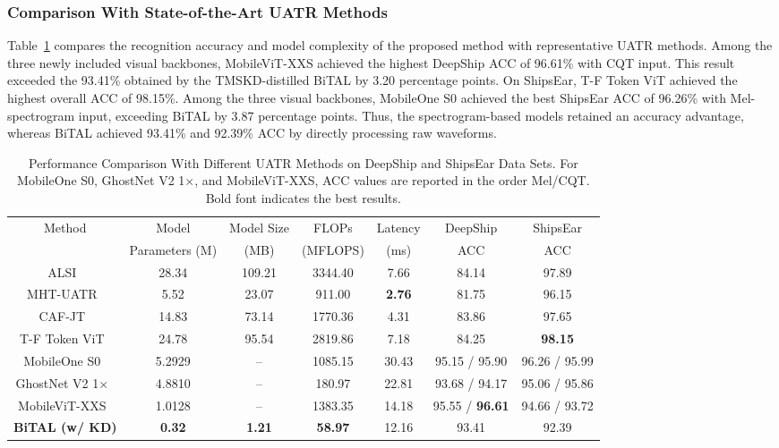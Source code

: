 ﻿\documentclass[lettersize,journal]{IEEEtran}
\begin{document}
\subsubsection{Comparison With State-of-the-Art UATR Methods}
Table~\ref{tab:comparison with Different UATR Methods} compares the recognition accuracy and model complexity of the proposed method with representative UATR methods. Among the three newly included visual backbones, MobileViT-XXS achieved the highest DeepShip ACC of 96.61\% with CQT input. This result exceeded the 93.41\% obtained by the TMSKD-distilled BiTAL by 3.20 percentage points. On ShipsEar, T-F Token ViT achieved the highest overall ACC of 98.15\%. Among the three visual backbones, MobileOne S0 achieved the best ShipsEar ACC of 96.26\% with Mel-spectrogram input, exceeding BiTAL by 3.87 percentage points. Thus, the spectrogram-based models retained an accuracy advantage, whereas BiTAL achieved 93.41\% and 92.39\% ACC by directly processing raw waveforms.

\begin{table}[!htbp]
\centering
\caption{Performance Comparison With Different UATR Methods on DeepShip and ShipsEar Data Sets. For MobileOne S0, GhostNet V2 1$\times$, and MobileViT-XXS, ACC values are reported in the order Mel/CQT. Bold font indicates the best results.}
\label{tab:comparison with Different UATR Methods}
\small
\setlength{\tabcolsep}{4pt}
\begin{tabular}{c|c|c|c|c|c|c}
\toprule
\multirow{2}{*}{Method} &
\multicolumn{1}{c|}{Model} &
\multicolumn{1}{c|}{Model Size} &
\multicolumn{1}{c|}{FLOPs} &
\multicolumn{1}{c|}{Latency} &
\multicolumn{1}{c|}{DeepShip} &
\multicolumn{1}{c}{ShipsEar} \\
 & Parameters (M) & (MB) & (MFLOPS) & (ms) & ACC & ACC \\
\midrule
ALSI~\cite{ALSIUATR} & 28.34 & 109.21 & 3344.40 & 7.66 & 84.14 & 97.89  \\
MHT-UATR~\cite{MHTUATR} & 5.52 & 23.07 & 911.00 & \textbf{2.76} & 81.75 & 96.15 \\
CAF-JT~\cite{CAFJTUATR} & 14.83 & 73.14 & 1770.36 & 4.31 & 83.86 & 97.65 \\
T-F Token ViT~\cite{TFTokenViT} & 24.78 & 95.54 & 2819.86 & 7.18 & 84.25 & \textbf{98.15} \\
MobileOne S0~\cite{Vasu2023MobileOne} & 5.2929 & -- & 1085.15 & 30.43 & 95.15 / 95.90 & 96.26 / 95.99 \\
GhostNet V2 1$\times$~\cite{Tang2022GhostNetV2} & 4.8810 & -- & 180.97 & 22.81 & 93.68 / 94.17 & 95.06 / 95.86 \\
MobileViT-XXS~\cite{Mehta2022MobileViT} & 1.0128 & -- & 1383.35 & 14.18 & 95.55 / \textbf{96.61} & 94.66 / 93.72 \\
\textbf{BiTAL (w/ KD)} & \textbf{0.32} & \textbf{1.21} & \textbf{58.97} & 12.16 & 93.41 & 92.39 \\
\bottomrule
\end{tabular}
\end{table}
\end{document}
